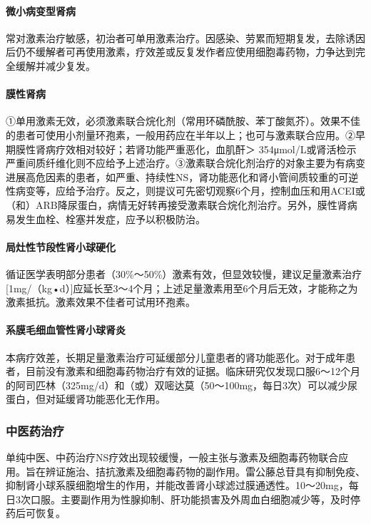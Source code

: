 \paragraph{微小病变型肾病}

常对激素治疗敏感，初治者可单用激素治疗。因感染、劳累而短期复发，去除诱因后仍不缓解者可再使用激素，疗效差或反复发作者应使用细胞毒药物，力争达到完全缓解并减少复发。

\paragraph{膜性肾病}

①单用激素无效，必须激素联合烷化剂（常用环磷酰胺、苯丁酸氮芥）。效果不佳的患者可使用小剂量环孢素，一般用药应在半年以上；也可与激素联合应用。②早期膜性肾病疗效相对较好；若肾功能严重恶化，血肌酐＞
354μmol/L或肾活检示严重间质纤维化则不应给予上述治疗。③激素联合烷化剂治疗的对象主要为有病变进展高危因素的患者，如严重、持续性NS，肾功能恶化和肾小管间质较重的可逆性病变等，应给予治疗。反之，则提议可先密切观察6个月，控制血压和用ACEI或（和）ARB降尿蛋白，病情无好转再接受激素联合烷化剂治疗。另外，膜性肾病易发生血栓、栓塞并发症，应予以积极防治。

\paragraph{局灶性节段性肾小球硬化}

循证医学表明部分患者（30\%～50\%）激素有效，但显效较慢，建议足量激素治疗{[}1mg/（kg•d）{]}应延长至3～4个月；上述足量激素用至6个月后无效，才能称之为激素抵抗。激素效果不佳者可试用环孢素。

\paragraph{系膜毛细血管性肾小球肾炎}

本病疗效差，长期足量激素治疗可延缓部分儿童患者的肾功能恶化。对于成年患者，目前没有激素和细胞毒药物治疗有效的证据。临床研究仅发现口服6～12个月的阿司匹林（325mg/d）和（或）双嘧达莫（50～100mg，每日3次）可以减少尿蛋白，但对延缓肾功能恶化无作用。

\subsubsection{中医药治疗}

单纯中医、中药治疗NS疗效出现较缓慢，一般主张与激素及细胞毒药物联合应用。旨在辨证施治、拮抗激素及细胞毒药物的副作用。雷公藤总苷具有抑制免疫、抑制肾小球系膜细胞增生的作用，并能改善肾小球滤过膜通透性。10～20mg，每日3次口服。主要副作用为性腺抑制、肝功能损害及外周血白细胞减少等，及时停药后可恢复。

